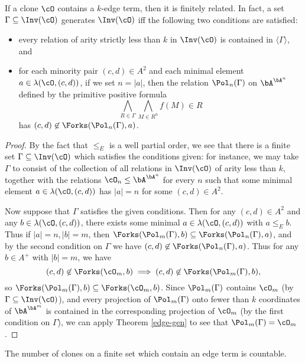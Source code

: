 \begin{thm}\label{few-finite} If a clone $\cO$ contains a $k$-edge term, then it is finitely related. In fact, a set $\Gamma \subseteq \Inv(\cO)$ generates $\Inv(\cO)$ iff the following two conditions are satisfied:
\begin{itemize}
\item every relation of arity strictly less than $k$ in $\Inv(\cO)$ is contained in $\langle \Gamma \rangle$, and
\item for each minority pair $(c,d) \in A^2$ and each minimal element $a \in \lambda(\cO,(c,d))$, if we set $n = |a|$, then the relation $\Pol_n(\Gamma)$ on $\bA^{\bA^n}$ defined by the primitive positive formula
\[
\bigwedge_{R \in \Gamma} \bigwedge_{M \in R^n} f(M) \in R
\]
has $(c,d) \not\in \Forks(\Pol_n(\Gamma),a)$.
\end{itemize}
\end{thm}
\begin{proof} By the fact that $\le_E$ is a well partial order, we see that there is a finite set $\Gamma \subseteq \Inv(\cO)$ which satisfies the conditions given: for instance, we may take $\Gamma$ to consist of the collection of all relations in $\Inv(\cO)$ of arity less than $k$, together with the relations $\cO_n \le \bA^{\bA^n}$ for every $n$ such that some minimal element $a \in \lambda(\cO,(c,d))$ has $|a| = n$ for some $(c,d) \in A^2$.

Now suppose that $\Gamma$ satisfies the given conditions. Then for any $(c,d) \in A^2$ and any $b \in \lambda(\cO,(c,d))$, there exists some minimal $a \in \lambda(\cO,(c,d))$ with $a \le_E b$. Thus if $|a| = n, |b| = m$, then $\Forks(\Pol_m(\Gamma),b) \subseteq \Forks(\Pol_n(\Gamma),a)$, and by the second condition on $\Gamma$ we have $(c,d) \not\in \Forks(\Pol_n(\Gamma),a)$. Thus for any $b \in A^+$ with $|b| = m$, we have
\[
(c,d) \not\in \Forks(\cO_m,b) \implies (c,d) \not\in \Forks(\Pol_m(\Gamma),b),
\]
so $\Forks(\Pol_m(\Gamma),b) \subseteq \Forks(\cO_m,b)$. Since $\Pol_m(\Gamma)$ contains $\cO_m$ (by $\Gamma \subseteq \Inv(\cO)$), and every projection of $\Pol_m(\Gamma)$ onto fewer than $k$ coordinates of $\bA^{\bA^m}$ is contained in the corresponding projection of $\cO_m$ (by the first condition on $\Gamma$), we can apply Theorem \ref{edge-gen} to see that $\Pol_m(\Gamma) = \cO_m$.
\end{proof}

\begin{cor} The number of clones on a finite set which contain an edge term is countable.
\end{cor}

